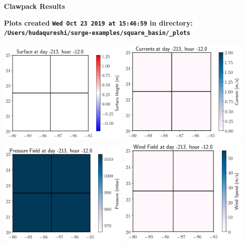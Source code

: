 \documentclass[11pt]{article}
\begin{document}
        \begin{center}{\Large\bf Clawpack Results}\vskip 5pt
        
        \bf Plots created {\tt Wed Oct 23 2019 at 15:46:59} in directory: \vskip 5pt
        \verb+/Users/hudaqureshi/surge-examples/square_basin/_plots+
        \end{center}
        \vskip 5pt
        \includegraphics[width=0.475\textwidth]{frame0000fig0.png}
\includegraphics[width=0.475\textwidth]{frame0000fig1.png}
\vskip 10pt 
\includegraphics[width=0.475\textwidth]{frame0000fig2.png}
\includegraphics[width=0.475\textwidth]{frame0000fig4.png}
\end{document}
